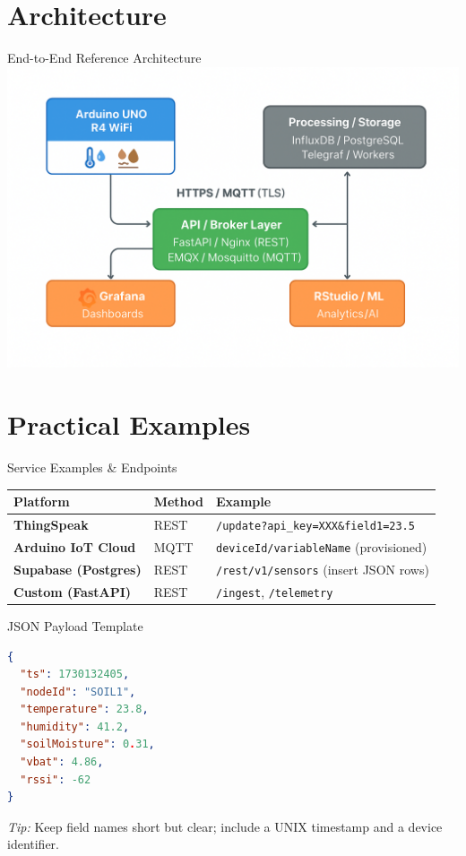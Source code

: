 \documentclass[aspectratio=169]{beamer}
\begin{document}
\section{Architecture}
\begin{frame}{End-to-End Reference Architecture}
\centering
\includegraphics[width=\linewidth]{A_flowchart_diagram_in_a_digital_vector_illustrati.png}
\end{frame}







\section{Practical Examples}
\begin{frame}{Service Examples \& Endpoints}
\begin{tabular}{>{\bfseries}m{3.0cm} m{3.5cm} m{7.5cm}}
Platform & Method & Example \\
\midrule
ThingSpeak & REST & \texttt{/update?api\_key=XXX\&field1=23.5} \\
Arduino IoT Cloud & MQTT & \texttt{deviceId/variableName} (provisioned) \\
Supabase (Postgres) & REST & \texttt{/rest/v1/sensors} (insert JSON rows) \\
Custom (FastAPI) & REST & \texttt{/ingest}, \texttt{/telemetry} \\
\end{tabular}
\end{frame}

\begin{frame}[fragile]{JSON Payload Template}
\begin{lstlisting}[language=JSON,style=tinyterminal]
{
  "ts": 1730132405,
  "nodeId": "SOIL1",
  "temperature": 23.8,
  "humidity": 41.2,
  "soilMoisture": 0.31,
  "vbat": 4.86,
  "rssi": -62
}
\end{lstlisting}
\textit{Tip:} Keep field names short but clear; include a UNIX timestamp and a device identifier.
\end{frame}
\end{document}
